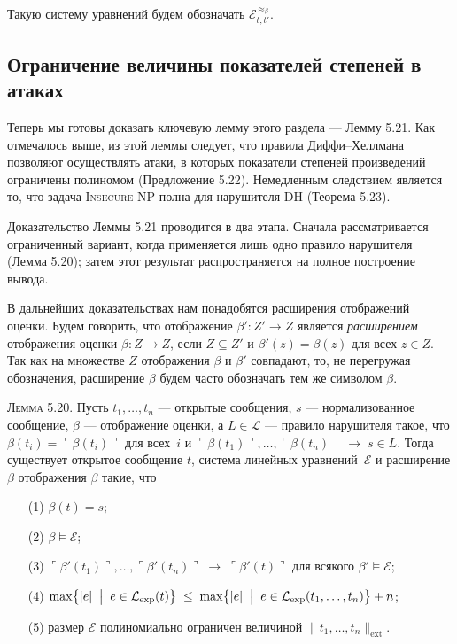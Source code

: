 Такую систему уравнений будем обозначать
\(
   \mathcal E^{\,\approx_{\beta}}_{t,t'}.
\)

\subsection{Ограничение величины показателей степеней в атаках}

Теперь мы готовы доказать ключевую лемму этого раздела — Лемму 5.21.
Как отмечалось выше, из этой леммы следует, что правила Диффи–Хеллмана
позволяют осуществлять атаки, в которых показатели степеней произведений
ограничены полиномом (Предложение 5.22).
Немедленным следствием является то, что задача
\textsc{Insecure} NP-полна для нарушителя DH (Теорема 5.23).

Доказательство Леммы 5.21 проводится в два этапа.
Сначала рассматривается ограниченный вариант, когда
применяется лишь одно правило нарушителя (Лемма 5.20);
затем этот результат распространяется на полное построение вывода.

В дальнейших доказательствах нам понадобятся расширения отображений
оценки. Будем говорить, что отображение
\(\beta' : Z' \to Z\) является \emph{расширением}
отображения оценки \(\beta : Z \to Z\), если \(Z\subseteq Z'\) и \(\beta'(z)=\beta(z)\) для всех \(z\in Z\).
Так как на множестве \(Z\) отображения \(\beta\) и \(\beta'\) совпадают,
то, не перегружая обозначения, расширение \(\beta\) будем
часто обозначать тем же символом \(\beta\).

\textsc{Лемма 5.20.}
Пусть $t_{1},\dots,t_{n}$ — открытые сообщения,
$s$ — нормализованное сообщение,
$\beta$ — отображение оценки,
а $L\in\mathcal L$ — правило нарушителя такое, что
$\beta(t_{i})=\ulcorner\beta(t_{i})\urcorner$ для всех~$i$
и
$\ulcorner\beta(t_{1})\urcorner,\dots,
 \ulcorner\beta(t_{n})\urcorner \;\rightarrow\; s\in L$.
Тогда существует открытое сообщение $t$,
система линейных уравнений~$\mathcal E$
и расширение $\beta$ отображения $\beta$ такие, что
\begin{enumerate}\itemsep0pt
  \item[\textup{(1)}] $\beta(t)=s$;
  \item[\textup{(2)}] $\beta \models \mathcal E$;
  \item[\textup{(3)}] $\ulcorner\beta'(t_{1})\urcorner,\dots,
        \ulcorner\beta'(t_{n})\urcorner
        \;\rightarrow\;
        \ulcorner\beta'(t)\urcorner$
        для всякого $\beta'\models\mathcal E$;
  \item[\textup{(4)}] $\displaystyle
        \max\bigl\{|e|\;\bigm|\;e\in \mathcal L_{\text{exp}}(t)\bigr\}
        \;\le\;
        \max\bigl\{|e|\;\bigm|\;e\in \mathcal L_{\text{exp}}(t_{1},\dots,t_{n})\bigr\}
        + n$;
  \item[\textup{(5)}] размер $\mathcal E$ полиномиально ограничен
        величиной $\lVert t_{1},\dots,t_{n}\rVert_{\text{ext}}$.
\end{enumerate}

